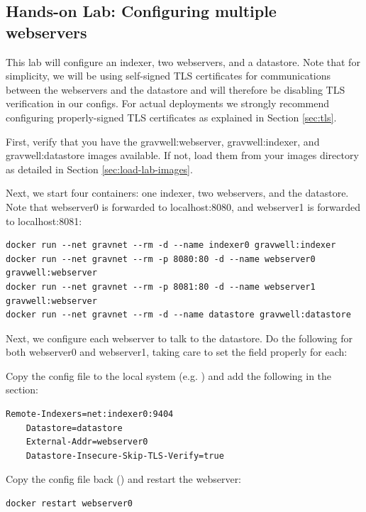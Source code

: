 \subsection{Hands-on Lab: Configuring multiple webservers}

This lab will configure an indexer, two webservers, and a datastore. Note that for
simplicity, we will be using self-signed TLS certificates for communications between
the webservers and the datastore and will therefore be disabling TLS verification in
our configs. For actual deployments we strongly recommend configuring properly-signed
TLS certificates as explained in Section \ref{sec:tls}.

First, verify that you have the gravwell:webserver, gravwell:indexer, and gravwell:datastore
images available. If not, load them from your images directory as detailed in
Section \ref{sec:load-lab-images}.

Next, we start four containers: one indexer, two webservers, and the
datastore. Note that webserver0 is forwarded to localhost:8080, and
webserver1 is forwarded to localhost:8081:

\begin{Verbatim}[breaklines=true]
docker run --net gravnet --rm -d --name indexer0 gravwell:indexer
docker run --net gravnet --rm -p 8080:80 -d --name webserver0 gravwell:webserver
docker run --net gravnet --rm -p 8081:80 -d --name webserver1 gravwell:webserver
docker run --net gravnet --rm -d --name datastore gravwell:datastore
\end{Verbatim}

Next, we configure each webserver to talk to the datastore. Do the
following for both webserver0 and webserver1, taking care to set the
 field properly for each:

Copy the config file to the local system
(e.g. )
and add the following in the \code{[Global]} section:

\begin{Verbatim}[breaklines=true]
    Remote-Indexers=net:indexer0:9404
    Datastore=datastore
    External-Addr=webserver0
    Datastore-Insecure-Skip-TLS-Verify=true
\end{Verbatim}

Copy the config file back ()
and restart the webserver:

\begin{Verbatim}[breaklines=true]
docker restart webserver0
\end{Verbatim}

